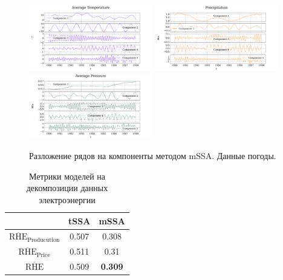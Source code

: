 		\begin{figure}[h!]
			\centering
			\includegraphics[width=0.48\textwidth, keepaspectratio]{../experiments/weather/mssa/figs/decomposition/manual/grouping_1/Average_Temperature.png}
			\includegraphics[width=0.48\textwidth, keepaspectratio]{../experiments/weather/mssa/figs/decomposition/manual/grouping_1/Precipitation.png}
			\includegraphics[width=0.48\textwidth, keepaspectratio]{../experiments/weather/mssa/figs/decomposition/manual/grouping_1/Average_Pressure.png}
			\caption{Разложение рядов на компоненты методом mSSA. Данные погоды.}\label{fig:weather_decomp_mssa}
		\end{figure}
		
		\def\arraystretch{1.2}
		\begin{table}[h!]
			\centering
			\caption{Метрики моделей на декомпозиции данных электроэнергии}\label{tab:decomp_electr_results}
			\begin{tabular}{|c|c|c|}
				\hline
				& tSSA  & mSSA           \\ \hline
				$ \overline{\text{RHE}}_{\text{Producution}} $  & 0.507 & 0.308          \\ \hline
				$ \overline{\text{RHE}}_{\text{Price}} $      & 0.511 & 0.31           \\ \hline
				$ \overline{\text{RHE}} $             & 0.509 & \textbf{0.309} \\ \hline
			\end{tabular}
		\end{table}
		
